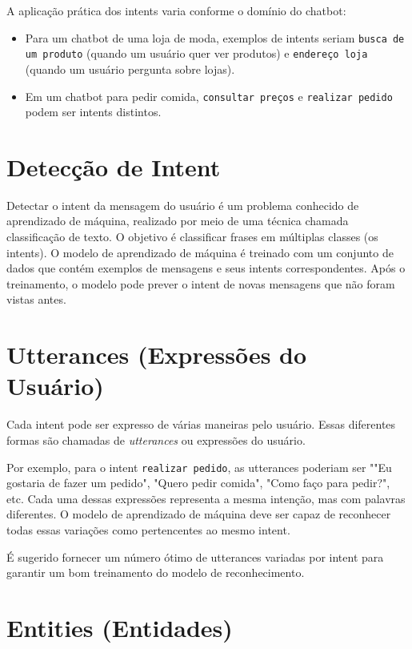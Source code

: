 \documentclass[14pt,a4paper,oneside]{book}
\begin{document}
A aplicação prática dos intents varia conforme o domínio do chatbot:
\begin{itemize}
    \item Para um chatbot de uma loja de moda, exemplos de intents seriam \texttt{busca de um produto} (quando um usuário quer ver produtos) e \texttt{endereço loja} (quando um usuário pergunta sobre lojas).
    \item Em um chatbot para pedir comida, \texttt{consultar preços} e \texttt{realizar pedido} podem ser intents distintos.
\end{itemize}

\section{Detecção de Intent}
\label{sec:intents_deteccao}

Detectar o intent da mensagem do usuário é um problema conhecido de aprendizado de máquina, realizado por meio de uma técnica chamada classificação de texto. O objetivo é classificar frases em múltiplas classes (os intents). O modelo de aprendizado de máquina é treinado com um conjunto de dados que contém exemplos de mensagens e seus intents correspondentes. Após o treinamento, o modelo pode prever o intent de novas mensagens que não foram vistas antes.

\section{Utterances (Expressões do Usuário)}
\label{sec:intents_utterances}

Cada intent pode ser expresso de várias maneiras pelo usuário. Essas diferentes formas são chamadas de \textit{utterances} ou expressões do usuário. 

Por exemplo, para o intent \texttt{realizar pedido}, as utterances poderiam ser ""Eu gostaria de fazer um pedido", "Quero pedir comida", "Como faço para pedir?", etc. Cada uma dessas expressões representa a mesma intenção, mas com palavras diferentes. O modelo de aprendizado de máquina deve ser capaz de reconhecer todas essas variações como pertencentes ao mesmo intent.

É sugerido fornecer um número ótimo de utterances variadas por intent para garantir um bom treinamento do modelo de reconhecimento.

\section{Entities (Entidades)}
\label{sec:intents_entities}
\end{document}

